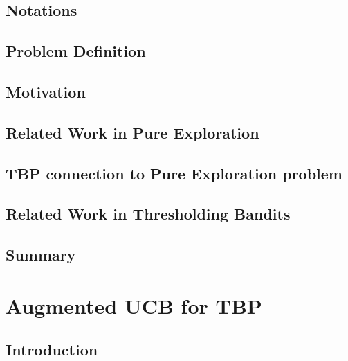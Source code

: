 \documentclass[MS]{iitmdiss}
\begin{document}
\section{Notations}
\label{tbandit:notations}


\section{Problem Definition}
\label{tbandit:probDef}


\section{Motivation}
\label{tbandit:motivation}


\section{Related Work in Pure Exploration}
\label{tbandit:prevRes}


\section{TBP connection to Pure Exploration problem}
\label{tbandit:connection}



\section{Related Work in Thresholding Bandits}
\label{tbandit:prevResAPT}



\section{Summary}
\label{tbandit:conc}







\chapter{Augmented UCB for TBP}
\label{chap:tbandit2}

\section{Introduction}
\label{tbandit:intro2}

\end{document}
